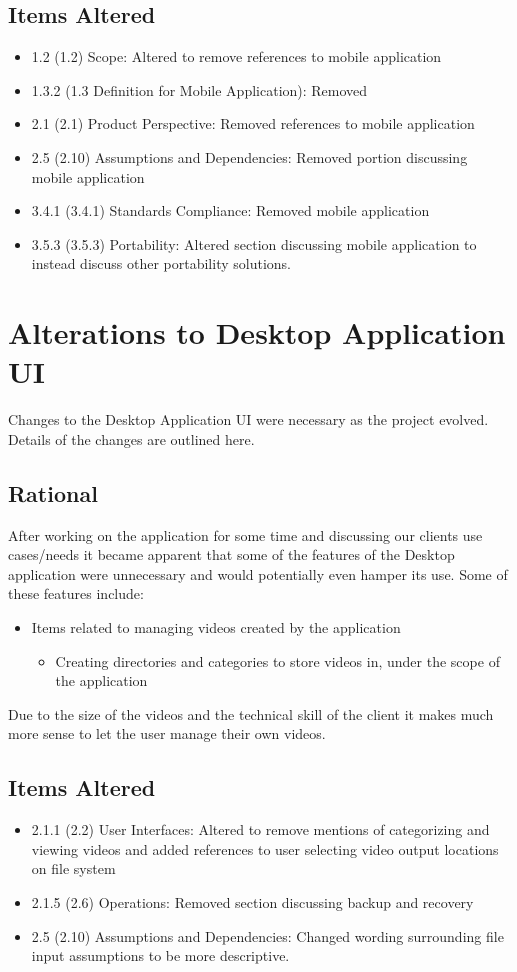 \documentclass[10pt,letterpaper,onecolumn]{article}
\begin{document}
\subsection{Items Altered}
\begin{itemize}
  \item 1.2 (1.2) Scope: Altered to remove references to mobile application
  \item 1.3.2 (1.3 Definition for Mobile Application): Removed
  \item 2.1 (2.1) Product Perspective: Removed references to mobile application
  \item 2.5 (2.10) Assumptions and Dependencies: Removed portion discussing mobile application
  \item 3.4.1 (3.4.1) Standards Compliance: Removed mobile application
  \item 3.5.3 (3.5.3) Portability: Altered section discussing mobile application to instead discuss other portability solutions.
\end{itemize}

\section{Alterations to Desktop Application UI}
Changes to the Desktop Application UI were necessary as the project evolved.
Details of the changes are outlined here.
\subsection{Rational}
After working on the application for some time and discussing our clients use cases/needs it became apparent that some of the features of the Desktop application were unnecessary and would potentially even hamper its use. Some of these features include:
\begin{itemize}
  \item Items related to managing videos created by the application
  \begin{itemize}
    \item Creating directories and categories to store videos in, under the scope of the application
  \end{itemize}
\end{itemize}
Due to the size of the videos and the technical skill of the client it makes much more sense to let the user manage their own videos.
\subsection{Items Altered}
\begin{itemize}
  \item 2.1.1 (2.2) User Interfaces: Altered to remove mentions of categorizing and viewing videos and added references to user selecting video output locations on file system
  \item 2.1.5 (2.6) Operations: Removed section discussing backup and recovery
  \item 2.5 (2.10) Assumptions and Dependencies: Changed wording surrounding file input assumptions to be more descriptive.
\end{itemize}
\end{document}
